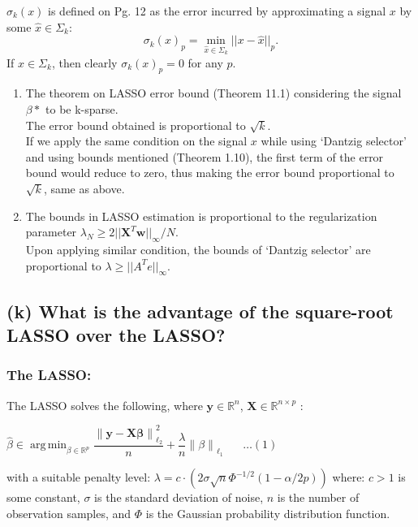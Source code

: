 \documentclass[fleqn, 11pt]{article}
\DeclareMathOperator*{\argmin}{arg\,min}
\newcommand{\bs}[1]{\boldsymbol{#1}}
\newcommand\norm[1]{\left\lVert#1\right\rVert}
\begin{document}
$\sigma_k(x)$ is defined on Pg. 12 as the error incurred by approximating a signal $x$ by some $\hat{x} \in \Sigma_k$: $$\sigma_k (x)_p = \min_{\hat{x} \in \Sigma_k} ||x - \hat{x}||_p.$$
If $x \in \Sigma_k$, then clearly $\sigma_k (x)_p = 0$ for any $p$.\\

\begin{enumerate}
    \item The theorem on LASSO error bound (Theorem 11.1) considering the signal $\beta*$ to be k-sparse. \\
        The error bound obtained is proportional to $\sqrt{k}$. \\
        If we apply the same condition on the signal $x$ while using `Dantzig selector' and using bounds mentioned (Theorem 1.10), the first term of the error bound would reduce to zero, thus making the error bound proportional to $\sqrt{k}$, same as above.
    \item The bounds in LASSO estimation is proportional to the regularization parameter $\lambda_N \ge 2 ||\mathbf{X}^T \mathbf{w} ||_{\infty}/N$. \\
        Upon applying similar condition, the bounds of `Dantzig selector' are proportional to $\lambda \ge || A^T e ||_{\infty}$.
\end{enumerate}


\bigskip

\newpage
\subsection*{(k) What is the advantage of the square-root LASSO over the LASSO?}

\subsubsection*{The LASSO:}

The LASSO solves the following, where $ \bs{y} \in \mathbb{R}^n$, $ \bs{X} \in \mathbb{R}^{n \times p} $ :

\begin{center}
    
$\hat{\beta} \in \displaystyle 
\argmin_{\beta \in \mathbb{R}^p} \dfrac{\norm{\bs{y-X \beta}}_{\ell_2}^2}{n}
+ \dfrac{\lambda}{n} \norm{\beta}_{\ell_1} \hspace{20pt}\ldots(1) $   

\end{center}

with a suitable penalty level: $\lambda = c \cdot ( 2 \sigma \sqrt{n} \Phi^{-1/2}(1-\alpha / 2p) ) $
where: 
$c>1$ is some constant, $\sigma$ is the standard deviation of noise, $n$ is the number of observation samples, 
and $\Phi$ is the Gaussian probability distribution function.
\end{document}
